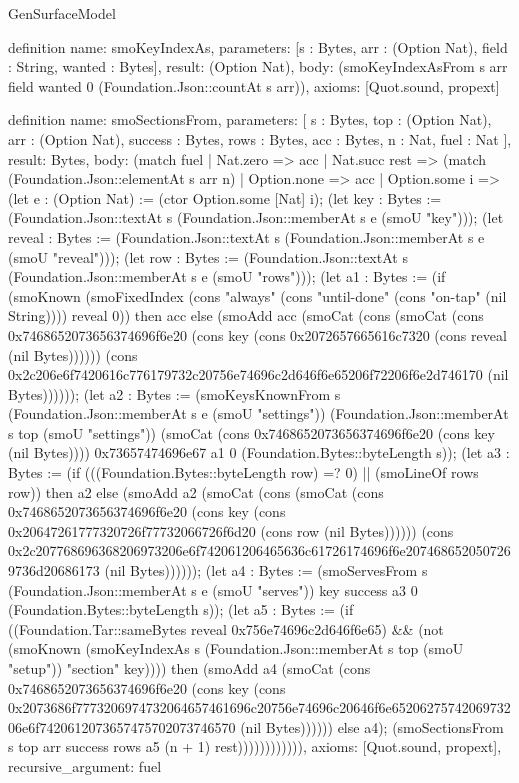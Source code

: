 \begin{lexlean}{GenSurfaceModel}
\begin{semanticmodule}
definition{
  name: smoKeyIndexAs,
  parameters: [s : Bytes, arr : (Option Nat), field : String, wanted : Bytes],
  result: (Option Nat),
  body: (smoKeyIndexAsFrom s arr field wanted 0 (Foundation.Json::countAt s arr)),
  axioms: [Quot.sound, propext]
}

definition{
  name: smoSectionsFrom,
  parameters: [
    s : Bytes,
    top : (Option Nat),
    arr : (Option Nat),
    success : Bytes,
    rows : Bytes,
    acc : Bytes,
    n : Nat,
    fuel : Nat
  ],
  result: Bytes,
  body: (match fuel
    | Nat.zero => acc
    | Nat.succ rest => (match (Foundation.Json::elementAt s arr n)
      | Option.none => acc
      | Option.some i => (let e : (Option Nat) := (ctor Option.some [Nat] i); (let key : Bytes := (Foundation.Json::textAt s (Foundation.Json::memberAt s e (smoU "key"))); (let reveal : Bytes := (Foundation.Json::textAt s (Foundation.Json::memberAt s e (smoU "reveal"))); (let row : Bytes := (Foundation.Json::textAt s (Foundation.Json::memberAt s e (smoU "rows"))); (let a1 : Bytes := (if (smoKnown (smoFixedIndex (cons "always" (cons "until-done" (cons "on-tap" (nil String)))) reveal 0)) then acc else (smoAdd acc (smoCat (cons (smoCat (cons 0x7468652073656374696f6e20 (cons key (cons 0x2072657665616c7320 (cons reveal (nil Bytes)))))) (cons 0x2c206e6f7420616c776179732c20756e74696c2d646f6e65206f72206f6e2d746170 (nil Bytes)))))); (let a2 : Bytes := (smoKeysKnownFrom s (Foundation.Json::memberAt s e (smoU "settings")) (Foundation.Json::memberAt s top (smoU "settings")) (smoCat (cons 0x7468652073656374696f6e20 (cons key (nil Bytes)))) 0x73657474696e67 a1 0 (Foundation.Bytes::byteLength s)); (let a3 : Bytes := (if (((Foundation.Bytes::byteLength row) =? 0) || (smoLineOf rows row)) then a2 else (smoAdd a2 (smoCat (cons (smoCat (cons 0x7468652073656374696f6e20 (cons key (cons 0x20647261777320726f77732066726f6d20 (cons row (nil Bytes)))))) (cons 0x2c207768696368206973206e6f742061206465636c61726174696f6e2074686520507269736d20686173 (nil Bytes)))))); (let a4 : Bytes := (smoServesFrom s (Foundation.Json::memberAt s e (smoU "serves")) key success a3 0 (Foundation.Bytes::byteLength s)); (let a5 : Bytes := (if ((Foundation.Tar::sameBytes reveal 0x756e74696c2d646f6e65) && (not (smoKnown (smoKeyIndexAs s (Foundation.Json::memberAt s top (smoU "setup")) "section" key)))) then (smoAdd a4 (smoCat (cons 0x7468652073656374696f6e20 (cons key (cons 0x2073686f7773206974732064657461696c20756e74696c20646f6e6520627574206973206e6f7420612073657475702073746570 (nil Bytes)))))) else a4); (smoSectionsFrom s top arr success rows a5 (n + 1) rest)))))))))))),
  axioms: [Quot.sound, propext],
  recursive_argument: fuel
}


\end{semanticmodule}
\end{lexlean}
